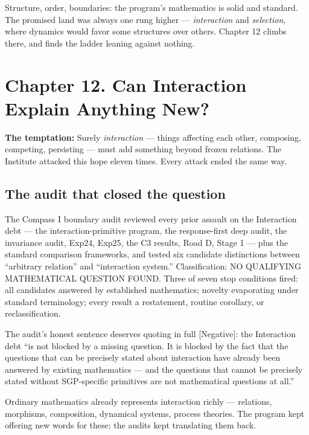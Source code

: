 \documentclass[
  11pt,
]{book}
\begin{document}
Structure, order, boundaries: the program's mathematics is solid and
standard. The promised land was always one rung higher ---
\emph{interaction} and \emph{selection}, where dynamics would favor some
structures over others. Chapter 12 climbs there, and finds the ladder
leaning against nothing.

\newpage

\chapter{Chapter 12. Can Interaction Explain Anything
New?}\label{chapter-12.-can-interaction-explain-anything-new}

\textbf{The temptation:} Surely \emph{interaction} --- things affecting
each other, composing, competing, persisting --- must add something
beyond frozen relations. The Institute attacked this hope eleven times.
Every attack ended the same way.

\section{The audit that closed the
question}\label{the-audit-that-closed-the-question}

The Compass I boundary audit reviewed every prior assault on the
Interaction debt --- the interaction-primitive program, the
response-first deep audit, the invariance audit, Exp24, Exp25, the C3
results, Road D, Stage 1 --- plus the standard comparison frameworks,
and tested six candidate distinctions between ``arbitrary relation'' and
``interaction system.'' Classification: NO QUALIFYING MATHEMATICAL
QUESTION FOUND. Three of seven stop conditions fired: all candidates
answered by established mathematics; novelty evaporating under standard
terminology; every result a restatement, routine corollary, or
reclassification.

The audit's honest sentence deserves quoting in full {[}Negative{]}: the
Interaction debt ``is not blocked by a missing question. It is blocked
by the fact that the questions that can be precisely stated about
interaction have already been answered by existing mathematics --- and
the questions that cannot be precisely stated without SGP-specific
primitives are not mathematical questions at all.''

Ordinary mathematics already represents interaction richly ---
relations, morphisms, composition, dynamical systems, process theories.
The program kept offering new words for these; the audits kept
translating them back.
\end{document}
